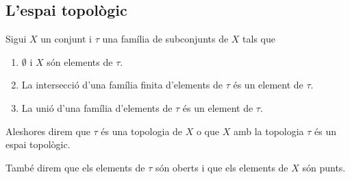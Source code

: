 \documentclass[../Apunts.tex]{subfiles}
\begin{document}
	\subsection{L'espai topològic}
	\begin{definition}[Topologia]	%
		\label{def:topologia}
		\label{def:espai topològic}
		\label{def:obert}
		\label{def:punt}
		Sigui \(X\) un conjunt i \(\tau\) una família de subconjunts de \(X\) tals que
		\begin{enumerate}
		\item \(\emptyset\) i \(X\) són elements de \(\tau\).
		\item La intersecció d'una família finita d'elements de \(\tau\) és un element de \(\tau\).
		\item La unió d'una família d'elements de \(\tau\) és un element de \(\tau\).
		\end{enumerate}
		Aleshores direm que \(\tau\) és una topologia de \(X\) o que \(X\) amb la topologia \(\tau\) és un espai topològic.
		
		També direm que els elements de \(\tau\) són oberts i que els elements de \(X\) són punts.
	\end{definition}
\end{document}
